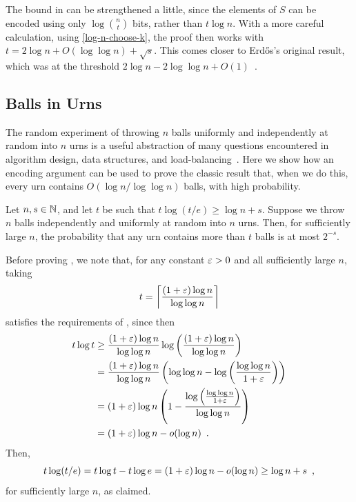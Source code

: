 \documentclass[format=acmsmall, review=false, screen=true]{acmart}
\begin{document}
\begin{rem}
  The bound in  can be strengthened a little,
  since the elements of $S$ can be encoded using only
  $\log\binom{n}{t}$ bits, rather than $t\log n$.  With a more careful
  calculation, using \eqref{log-n-choose-k}, the proof then works with
  $t = 2\log n +O(\log\log n) + \sqrt{s}$. This comes closer to 
  Erd\H{o}s's original result, which was at the threshold $2\log n - 2\log\log n +
  O(1)$~\cite{erdos:some}.
\end{rem}


\subsection{Balls in Urns}

The random experiment of  throwing $n$ balls uniformly and
independently at random into $n$ urns is a useful abstraction of many
questions encountered in algorithm design, data structures, and 
load-balancing~\cite{mitzenmacher.upfal:probability,motwani.raghavan:randomized}.  Here we
show how an encoding argument can be used to prove the classic result
that, when we do this, every urn contains $O(\log n/\log\log
n)$ balls, with high probability.

\begin{thm}
  Let $n, s \in \mathbb{N}$, and let $t$ be such that $t\log(t/e) \ge \log n + s$.
  Suppose we
  throw $n$ balls independently and uniformly at random into $n$
  urns. Then, for sufficiently large $n$, the probability that any urn
  contains more than $t$ balls is at most $2^{-s}$.
\end{thm}

Before proving , we note that, for any constant $\varepsilon >0$
and all sufficiently large $n$, taking
\[
  t = {\left\lceil \frac{(1+\varepsilon)\log n}{\log\log n} \right\rceil}
\] 
satisfies the requirements of ,  since then
\begin{align*}
  t \log t &\ge \frac{(1 + \varepsilon) \log n}{\log \log n} 
  \log \left( \frac{(1 + \varepsilon) \log n}{\log \log n}\right) \\
  &= \frac{(1 + \varepsilon) \log n}{\log \log n} 
  \left( \log\log n - \log\left(\frac{\log\log n}{1 + \varepsilon}\right)
  \right) \\
  &= (1 + \varepsilon) \log n 
  \left( 1 - \frac{\log\left(\frac{\log\log n}{1 + \varepsilon}\right)}{\log\log n}
     \right) \\
  &= (1+\varepsilon)\log n - o(\log n) \enspace.
\end{align*}
Then,
\[
  t \log (t/e) = t \log t - t \log e = (1+\varepsilon)\log n 
  - o(\log n) \ge \log n + s \enspace ,
\]
for sufficiently large $n$, as claimed.
\end{document}
